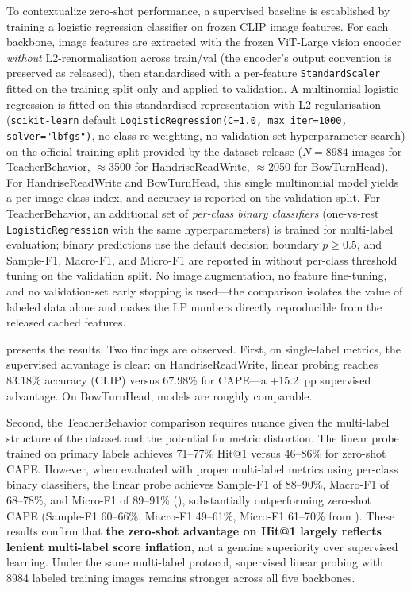 \documentclass[electronics,article,submit,pdftex,moreauthors]{Definitions/mdpi}
\begin{document}
To contextualize zero-shot performance, a supervised baseline is established by training a logistic regression classifier on frozen CLIP image features. For each backbone, image features are extracted with the frozen ViT-Large vision encoder \emph{without} L2-renormalisation across train/val (the encoder's output convention is preserved as released), then standardised with a per-feature \texttt{StandardScaler} fitted on the training split only and applied to validation. A multinomial logistic regression is fitted on this standardised representation with L2 regularisation (\texttt{scikit-learn} default \texttt{LogisticRegression(C=1.0, max\_iter=1000, solver="lbfgs")}, no class re-weighting, no validation-set hyperparameter search) on the official training split provided by the dataset release ($N=8984$ images for TeacherBehavior, $\approx$3500 for HandriseReadWrite, $\approx$2050 for BowTurnHead). For HandriseReadWrite and BowTurnHead, this single multinomial model yields a per-image class index, and accuracy is reported on the validation split. For TeacherBehavior, an additional set of \emph{per-class binary classifiers} (one-vs-rest \texttt{LogisticRegression} with the same hyperparameters) is trained for multi-label evaluation; binary predictions use the default decision boundary $p\geq0.5$, and Sample-F1, Macro-F1, and Micro-F1 are reported in  without per-class threshold tuning on the validation split. No image augmentation, no feature fine-tuning, and no validation-set early stopping is used---the comparison isolates the value of labeled data alone and makes the LP numbers directly reproducible from the released cached features.

 presents the results. Two findings are observed. First, on single-label metrics, the supervised advantage is clear: on HandriseReadWrite, linear probing reaches 83.18\% accuracy (CLIP) versus 67.98\% for CAPE---a +15.2~pp supervised advantage. On BowTurnHead, models are roughly comparable.

Second, the TeacherBehavior comparison requires nuance given the multi-label structure of the dataset and the potential for metric distortion. The linear probe trained on primary labels achieves 71--77\% Hit@1 versus 46--86\% for zero-shot CAPE. However, when evaluated with proper multi-label metrics using per-class binary classifiers, the linear probe achieves Sample-F1 of 88--90\%, Macro-F1 of 68--78\%, and Micro-F1 of 89--91\% (), substantially outperforming zero-shot CAPE (Sample-F1 60--66\%, Macro-F1 49--61\%, Micro-F1 61--70\% from ). These results confirm that \textbf{the zero-shot advantage on Hit@1 largely reflects lenient multi-label score inflation}, not a genuine superiority over supervised learning. Under the same multi-label protocol, supervised linear probing with 8984 labeled training images remains stronger across all five backbones.
\end{document}

